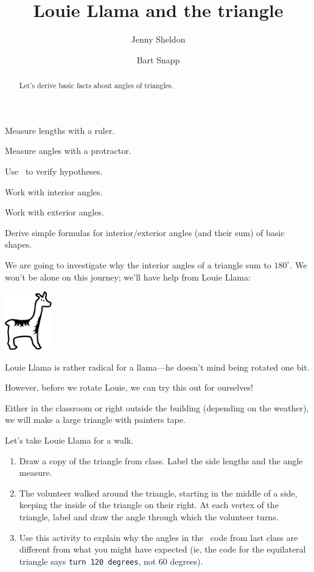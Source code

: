 \documentclass[nooutcomes,noauthor,handout]{../ximera}
\title{Louie Llama and the triangle}
\author{Jenny Sheldon \and Bart Snapp}
\begin{document}
\begin{abstract}
  Let's derive basic facts about angles of triangles.
\end{abstract}
\maketitle


\begin{listOutcomes}
\item Measure lengths with a ruler. 
\item Measure angles with a protractor.
\item Use \snap\ to verify hypotheses.
\item Work with interior angles.
\item Work with exterior angles.
\item Derive simple formulas for interior/exterior angles (and their
  sum) of basic shapes.
\end{listOutcomes}

We are going to investigate why the interior angles of a triangle sum
to $180^\circ$. We won't be alone on this journey; we'll have help from  Louie Llama:
\begin{center}
\includegraphics[height=1in]{llama.pdf}
\end{center}

Louie Llama is rather radical for a llama---he doesn't mind being
rotated one bit.

However, before we rotate Louie, we can try this out for ourselves!

Either in the classroom or right outside the building (depending on the weather), we will make a large triangle with painters tape. 

\mynewpage



\begin{question}
  Let's take Louie Llama for a walk.
  \begin{enumerate}
  \item Draw a copy of the triangle from class. Label the side lengths and the angle measure. 
  
  \item The volunteer walked around the triangle, starting in the middle of a side, keeping the inside of the triangle on their right. At each vertex of the triangle, label and draw the angle through which the volunteer turns.
  
  \item Use this activity to explain why the angles in the \snap\ code from last class are different from what you might have expected (ie, the code for the equilateral triangle says \texttt{turn 120 degrees}, not 60 degrees).  
 
 \end{enumerate}
 \end{question}
\end{document}
